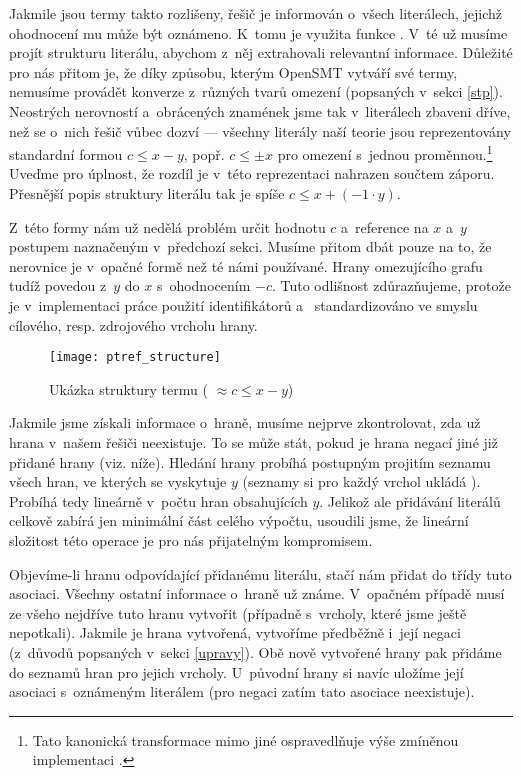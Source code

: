 Jakmile jsou termy takto rozlišeny, řešič je informován o~všech literálech, jejichž ohodnocení mu může být oznámeno. K~tomu je využita funkce . V~té už musíme projít strukturu literálu, abychom z~něj extrahovali relevantní informace. Důležité pro nás přitom je, že díky způsobu, kterým OpenSMT vytváří své termy, nemusíme provádět konverze z~různých tvarů omezení (popsaných v~sekci \ref{stp}). Neostrých nerovností a~obrácených znamének jsme tak v~literálech zbaveni dříve, než se o~nich řešič vůbec dozví --- všechny literály naší teorie jsou reprezentovány standardní formou $c \leq x - y$, popř. $c \leq \pm x$ pro omezení s~jednou proměnnou.\footnote{Tato kanonická transformace mimo jiné ospravedlňuje výše zmíněnou implementaci .} Uveďme pro úplnost, že rozdíl je v~této reprezentaci nahrazen součtem záporu. Přesnější popis struktury literálu tak je spíše $c \leq x + (-1 \cdot y)$.

Z~této formy nám už nedělá problém určit hodnotu $c$ a~reference na $x$ a~$y$ postupem naznačeným v~předchozí sekci. Musíme přitom dbát pouze na to, že nerovnice je v~opačné formě než té námi používané. Hrany omezujícího grafu tudíž povedou z~$y$ do $x$ s~ohodnocením $-c$. Tuto odlišnost zdůrazňujeme, protože je v~implementaci práce použití identifikátorů  a~ standardizováno ve smyslu cílového, resp. zdrojového vrcholu hrany.

\begin{figure}
	\centering
	\texttt{[image: ptref\_structure]}
	\caption{Ukázka struktury termu ( $\approx c \leq x - y$)}
\end{figure}

Jakmile jsme získali informace o~hraně, musíme nejprve zkontrolovat, zda už hrana v~našem řešiči neexistuje. To se může stát, pokud je hrana negací jiné již přidané hrany (viz. níže). %
Hledání hrany probíhá postupným projitím seznamu všech hran, ve kterých se vyskytuje $y$ (seznamy si pro každý vrchol ukládá ). Probíhá tedy lineárně v~počtu hran obsahujících $y$. Jelikož ale přidávání literálů celkově zabírá jen minimální část celého výpočtu, usoudili jsme, že lineární složitost této operace je pro nás přijatelným kompromisem.

Objevíme-li hranu odpovídající přidanému literálu, stačí nám přidat do třídy  tuto asociaci. Všechny ostatní informace o~hraně už známe. V~opačném případě musí ze všeho nejdříve  tuto hranu vytvořit (případně s~vrcholy, které jsme ještě nepotkali). Jakmile je hrana vytvořená, vytvoříme předběžně i~její negaci (z~důvodů popsaných v~sekci \ref{upravy}). Obě nově vytvořené hrany pak přidáme do seznamů hran pro jejich vrcholy. U~původní hrany si navíc uložíme její asociaci s~oznámeným literálem (pro negaci zatím tato asociace neexistuje). 

